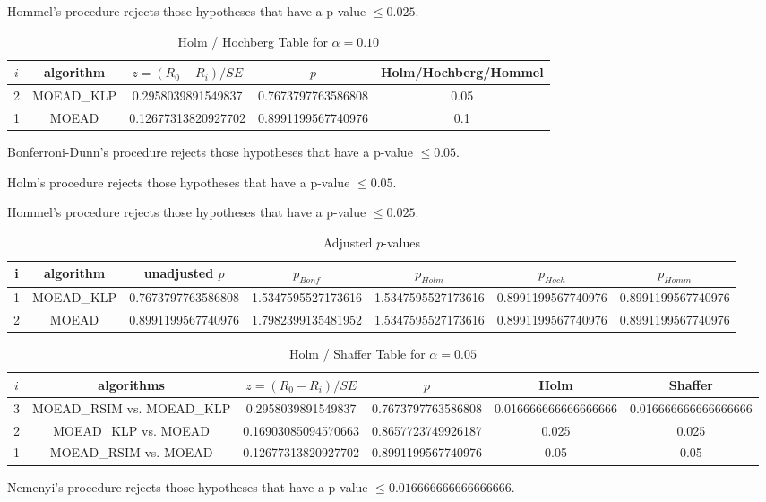 \documentclass[a4paper,10pt]{article}
\begin{document}
\begin{landscape}
Hommel's procedure rejects those hypotheses that have a p-value $\le0.025$.


\begin{table}[!htp]
\centering\tiny
\caption{Holm / Hochberg Table for $\alpha=0.10$}
\begin{tabular}{ccccc}
$i$&algorithm&$z=(R_0 - R_i)/SE$&$p$&Holm/Hochberg/Hommel\\
\hline
2&MOEAD_KLP&0.2958039891549837&0.7673797763586808&0.05\\
1&MOEAD&0.12677313820927702&0.8991199567740976&0.1\\
\hline
\end{tabular}
\end{table}
Bonferroni-Dunn's procedure rejects those hypotheses that have a p-value $\le0.05$.


Holm's procedure rejects those hypotheses that have a p-value $\le0.05$.


Hommel's procedure rejects those hypotheses that have a p-value $\le0.025$.


\begin{table}[!htp]
\centering\tiny
\caption{Adjusted $p$-values}
\begin{tabular}{ccccccc}
i&algorithm&unadjusted $p$&$p_{Bonf}$&$p_{Holm}$&$p_{Hoch}$&$p_{Homm}$\\
\hline
1&MOEAD_KLP&0.7673797763586808&1.5347595527173616&1.5347595527173616&0.8991199567740976&0.8991199567740976\\
2&MOEAD&0.8991199567740976&1.7982399135481952&1.5347595527173616&0.8991199567740976&0.8991199567740976\\
\hline
\end{tabular}
\end{table}

\begin{table}[!htp]
\centering\tiny
\caption{Holm / Shaffer Table for $\alpha=0.05$}
\begin{tabular}{cccccc}
$i$&algorithms&$z=(R_0 - R_i)/SE$&$p$&Holm&Shaffer\\
\hline
3&MOEAD_RSIM vs. MOEAD_KLP&0.2958039891549837&0.7673797763586808&0.016666666666666666&0.016666666666666666\\
2&MOEAD_KLP vs. MOEAD&0.16903085094570663&0.8657723749926187&0.025&0.025\\
1&MOEAD_RSIM vs. MOEAD&0.12677313820927702&0.8991199567740976&0.05&0.05\\
\hline
\end{tabular}
\end{table}
Nemenyi's procedure rejects those hypotheses that have a p-value $\le0.016666666666666666$.



\end{landscape}
\end{document}
